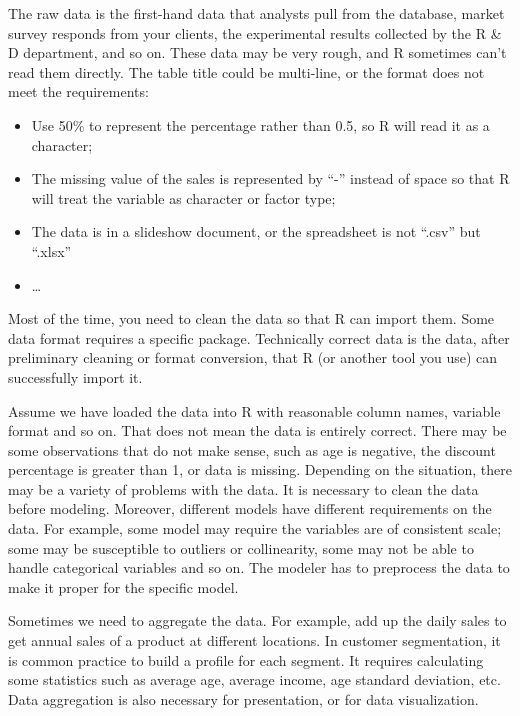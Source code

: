 \documentclass[12pt,]{krantz}
\providecommand{\tightlist}{%
  \setlength{\itemsep}{0pt}\setlength{\parskip}{0pt}}
\theoremstyle{definition}
\theoremstyle{definition}
\theoremstyle{definition}
\theoremstyle{remark}
\begin{document}
The raw data is the first-hand data that analysts pull from the
database, market survey responds from your clients, the experimental
results collected by the R \& D department, and so on. These data may be
very rough, and R sometimes can't read them directly. The table title
could be multi-line, or the format does not meet the requirements:

\begin{itemize}
\tightlist
\item
  Use 50\% to represent the percentage rather than 0.5, so R will read
  it as a character;
\item
  The missing value of the sales is represented by ``-'' instead of
  space so that R will treat the variable as character or factor type;
\item
  The data is in a slideshow document, or the spreadsheet is not
  ``.csv'' but ``.xlsx''
\item
  \ldots{}
\end{itemize}

Most of the time, you need to clean the data so that R can import them.
Some data format requires a specific package. Technically correct data
is the data, after preliminary cleaning or format conversion, that R (or
another tool you use) can successfully import it.

Assume we have loaded the data into R with reasonable column names,
variable format and so on. That does not mean the data is entirely
correct. There may be some observations that do not make sense, such as
age is negative, the discount percentage is greater than 1, or data is
missing. Depending on the situation, there may be a variety of problems
with the data. It is necessary to clean the data before modeling.
Moreover, different models have different requirements on the data. For
example, some model may require the variables are of consistent scale;
some may be susceptible to outliers or collinearity, some may not be
able to handle categorical variables and so on. The modeler has to
preprocess the data to make it proper for the specific model.

Sometimes we need to aggregate the data. For example, add up the daily
sales to get annual sales of a product at different locations. In
customer segmentation, it is common practice to build a profile for each
segment. It requires calculating some statistics such as average age,
average income, age standard deviation, etc. Data aggregation is also
necessary for presentation, or for data visualization.
\end{document}
